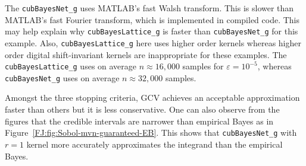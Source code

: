 \documentclass[graybox,footinfo]{svmult}
\begin{document}
The \texttt{cubBayesNet\_g} uses MATLAB's fast Walsh transform.  This is slower than MATLAB's fast Fourier transform, which is implemented in compiled code. This may help explain why \texttt{cubBayesLattice\_g} is faster than \texttt{cubBayesNet\_g} for this example. Also, \texttt{cubBayesLattice\_g} here uses higher order kernels whereas higher order digital shift-invariant kernels are inappropriate for these examples. The \texttt{cubBayesLattice\_g} uses on average $n \approx 16{,}000$ samples for $\varepsilon = 10^{-5}$, whereas \texttt{cubBayesNet\_g} uses on average $n \approx 32{,}000$ samples.

Amongst the three stopping criteria, GCV achieves an acceptable approximation faster than others but it is less conservative. 
One can also observe from the figures that the credible intervals are narrower than empirical Bayes as in Figure~\ref{FJ:fig:Sobol-mvn-guaranteed-EB}.
This shows that \texttt{cubBayesNet\_g} with $r=1$ kernel more accurately approximates the integrand than the empirical Bayes.
\end{document}
